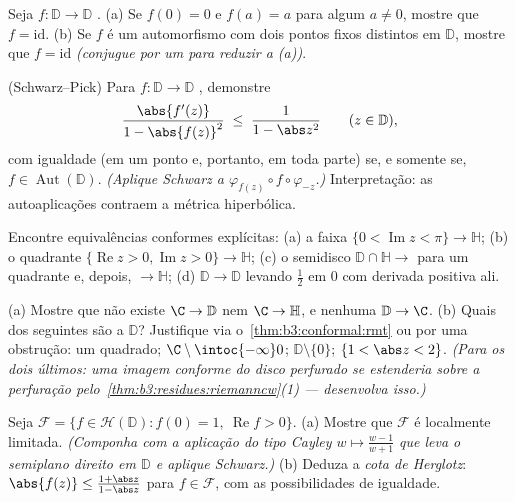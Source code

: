 \begin{exercise}[$\star$]\label{exo:b3:conformal:2}
Seja $f \colon \mathbb D \to \mathbb D$ .
(a) Se $f(0) = 0$ e $f(a) = a$ para algum $a \neq 0$, mostre que $f
= \mathrm{id}$.
(b) Se $f$ é um automorfismo com dois pontos fixos distintos em
$\mathbb D$, mostre que $f = \mathrm{id}$ \emph{(conjugue por um  para
reduzir a (a))}.
\end{exercise}

\begin{exercise}[$\star\star$]\label{exo:b3:conformal:3}
(Schwarz--Pick) Para $f\colon \mathbb D \to
\mathbb D$ , demonstre
\[
\frac{\abs{f'(z)}}{1 - \abs{f(z)}^2} \;\leq\;
\frac{1}{1 - \abs z^2}
\qquad (z \in \mathbb D),
\]
com igualdade (em um ponto e, portanto, em toda parte) se, e somente
se, $f \in
\operatorname{Aut}(\mathbb D)$. \emph{(Aplique Schwarz a $\varphi_{f(z)}\circ
f\circ\varphi_{-z}$.)} Interpretação: as
autoaplicações  contraem a métrica hiperbólica.
\end{exercise}

\begin{exercise}[$\star\star$]\label{exo:b3:conformal:4}
Encontre equivalências conformes explícitas:
(a) a faixa $\{0 < \operatorname{Im}z < \pi\} \to \mathbb H$;
(b) o quadrante $\{\operatorname{Re}z > 0,
\operatorname{Im}z > 0\} \to \mathbb H$;
(c) o semidisco $\mathbb D\cap\mathbb H \to$ para um quadrante e, depois, $\to \mathbb H$;
(d) $\mathbb D \to \mathbb D$ levando $\frac12$ em $0$ com derivada positiva ali.
\end{exercise}

\begin{exercise}[$\star\star$]\label{exo:b3:conformal:5}
(a) Mostre que não existe  $\C \to \mathbb D$ nem $\C \to
\mathbb H$, e nenhuma
$\mathbb D \to \C$.
(b) Quais dos seguintes são  a $\mathbb D$?
Justifique via o~\cref{thm:b3:conformal:rmt} ou por uma obstrução: um quadrado;
$\C\setminus\intoc{-\infty}0$; $\mathbb D\setminus\{0\}$; $\{1 < \abs z < 2\}$. \emph{(Para os dois últimos: uma imagem conforme do
disco perfurado se estenderia sobre a perfuração pelo~\cref{thm:b3:residues:riemanncw}(1)
--- desenvolva isso.)}
\end{exercise}

\begin{exercise}[$\star\star$]\label{exo:b3:conformal:6}
Seja $\mathcal F = \{f \in \mathcal H(\mathbb D) : f(0) = 1,\
\operatorname{Re}f > 0\}$.
(a) Mostre que $\mathcal F$ é localmente limitada. \emph{(Componha com a
aplicação do tipo Cayley $w \mapsto \frac{w -
1}{w + 1}$ que leva o semiplano direito em $\mathbb D$ e
aplique Schwarz.)}
(b) Deduza a \emph{cota de Herglotz}: $\abs{f(z)} \leq
\frac{1 + \abs z}{1 - \abs z}$ para $f \in \mathcal F$, com as
possibilidades de igualdade.
\end{exercise}

